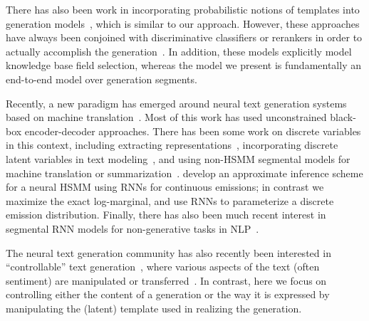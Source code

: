 \documentclass[11pt,a4paper]{article}
\begin{document}
There has also been work in incorporating probabilistic notions of templates into generation models~\citep{liang2009learning,konstas2013global}, which is similar to our approach. However, these approaches have always been conjoined with discriminative classifiers or rerankers in order to actually accomplish the generation~\citep{angeli2010simple,konstas2013global}. In addition, these models explicitly model knowledge base field selection, whereas the model we present is fundamentally an end-to-end model over generation segments.

Recently, a new paradigm has emerged around neural text generation systems based on machine translation~\citep{sutskever2014sequence,cho2014on,bahdanau2015neural}. Most of this  work has used unconstrained black-box encoder-decoder approaches. There has been some work on discrete variables in this context, including extracting representations~\citep{shen2018neural}, incorporating discrete latent variables in text modeling~\citep{yang2018breaking}, and using non-HSMM segmental models for machine translation or summarization~\citep{yu2016online,wang2017sequence, huang2018towards}. \citet{dai2017recurrent} develop an approximate inference scheme for a neural HSMM using RNNs for continuous emissions; in contrast we maximize the exact log-marginal, and use RNNs to parameterize a discrete emission distribution. Finally, there has also been much recent interest in segmental RNN models for non-generative tasks in NLP~\citep{tang2016end,kong2016segmental,lu2016segmental}. 

The neural text generation community has also recently been interested in ``controllable'' text generation~\citep{hu2017controllable}, where various aspects of the text (often sentiment) are manipulated or transferred~\citep{shen2017style,zhao2017adversarially,li2018style}. %
In contrast, here we focus on controlling either the content of a generation or the way it is expressed by manipulating the (latent) template used in realizing the generation.
\end{document}
